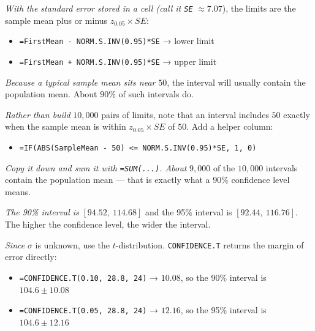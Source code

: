 \documentclass[
  11pt,
  letterpaper,
  DIV=11,
  numbers=noendperiod,
  oneside,
  open=any]{scrreprt}
\providecommand{\tightlist}{%
  \setlength{\itemsep}{0pt}\setlength{\parskip}{0pt}}\usepackage{longtable,booktabs,array}
\newenvironment{bsanswerkey}[2]{%
  \begin{tcolorbox}[bsbase, colback=bspaper2, colframe=bsline, fontupper=\small,
    title={\hypertarget{a-#1}{}\label{a-#1}\hyperlink{q-#1}{\textcolor{bsink2}{\MakeUppercase{#2}}}\hfill
      \hyperlink{q-#1}{\textcolor{bsaccent}{\normalfont\footnotesize back to page \pageref{q-#1}}}}]}%
  {\end{tcolorbox}}
\begin{document}
\begin{bsanswerkey}{bsans115}{Exercise 1, question 3}

\emph{With the standard error stored in a cell (call it \texttt{SE}}
\(\approx 7.07\)), the limits are the sample mean plus or minus
\(z_{0.05} \times SE\):

\begin{itemize}
\tightlist
\item
  \texttt{=FirstMean\ -\ NORM.S.INV(0.95)*SE} → lower limit
\item
  \texttt{=FirstMean\ +\ NORM.S.INV(0.95)*SE} → upper limit
\end{itemize}

\emph{Because a typical sample mean sits near} \(50\), the interval will
usually contain the population mean. About \(90\%\) of such intervals
do.

\end{bsanswerkey}

\begin{bsanswerkey}{bsans116}{Exercise 1, question 4}

\emph{Rather than build} \(10{,}000\) pairs of limits, note that an
interval includes \(50\) exactly when the sample mean is within
\(z_{0.05} \times SE\) of \(50\). Add a helper column:

\begin{itemize}
\tightlist
\item
  \texttt{=IF(ABS(SampleMean\ -\ 50)\ \textless{}=\ NORM.S.INV(0.95)*SE,\ 1,\ 0)}
\end{itemize}

\emph{Copy it down and sum it with \texttt{=SUM(...)}. About}
\(9{,}000\) of the \(10{,}000\) intervals contain the population mean
--- that is exactly what a \(90\%\) confidence level means.

\end{bsanswerkey}

\begin{bsanswerkey}{bsans117}{Exercise 2, question 1}

\emph{The 90\% interval is} \([94.52,\ 114.68]\) and the 95\% interval
is \([92.44,\ 116.76]\). The higher the confidence level, the wider the
interval.

\emph{Since} \(\sigma\) is unknown, use the \(t\)-distribution.
\texttt{CONFIDENCE.T} returns the margin of error directly:

\begin{itemize}
\tightlist
\item
  \texttt{=CONFIDENCE.T(0.10,\ 28.8,\ 24)} → \(10.08\), so the 90\%
  interval is \(104.6 \pm 10.08\)
\item
  \texttt{=CONFIDENCE.T(0.05,\ 28.8,\ 24)} → \(12.16\), so the 95\%
  interval is \(104.6 \pm 12.16\)
\end{itemize}

\end{bsanswerkey}
\end{document}

